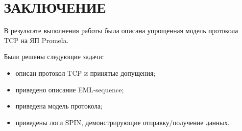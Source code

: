 \section*{ЗАКЛЮЧЕНИЕ}

В результате выполнения работы была описана упрощенная модель протокола TCP на ЯП Promela.

Были решены следующие задачи:
\begin{itemize}
	\item описан протокол TCP и принятые допущения;
	\item приведено описание EML-sequence;
	\item приведена модель протокола;
	\item приведены логи SPIN, демонстрирующие отправку/получение данных.
\end{itemize}

\pagebreak